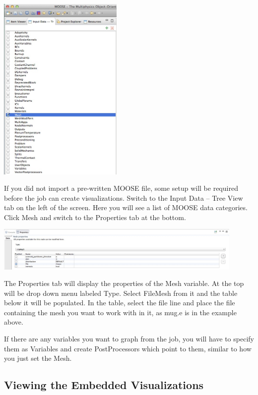 \begin{center}
\includegraphics[width=6cm]{images/MOOSETree} 
\end{center}

If you did not import a pre-written MOOSE file, some setup will be
required before the job can create visualizations. Switch to the Input Data --
Tree View tab on the left of the screen. Here you will see a list of MOOSE data
categories. Click Mesh and switch to the Properties tab at the bottom.

\begin{center}
\includegraphics[width=12cm]{images/MeshProperty} 
\end{center}

The Properties tab will display the properties of the Mesh variable. At the top
will be drop down menu labeled Type. Select FileMesh from it and the table below
it will be populated. In the table, select the file line and place the file
containing the mesh you want to work with in it, as mug.e is in the example
above.

If there are any variables you want to graph from the job, you will have to
specify them as Variables and create PostProcessors which point to them,
similar to how you just set the Mesh. 

\subsection{Viewing the Embedded Visualizations} 


